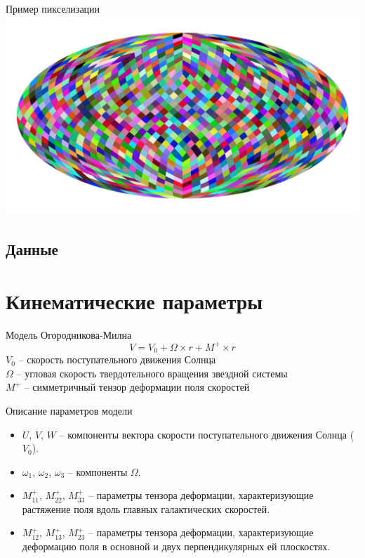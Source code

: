 \documentclass{beamer}
\begin{document}
\begin{frame}{Пример пикселизации}
\includegraphics[width=1\linewidth]{healpexample.jpg}
\end{frame}
\subsection{Данные}

\section{Кинематические параметры}
\begin{frame}{Модель Огородникова-Милна}
\begin{equation}\label{ogorod}
V=V_0+\Omega\times r+M^+\times r
\end{equation}
$V_0$ -- скорость поступательного движения Солнца\\ $\Omega$ -- угловая скорость твердотельного вращения звездной системы \\$M^+$ -- симметричный тензор деформации поля скоростей
\end{frame}

\begin{frame}{Описание параметров модели}
\begin{itemize}
\item $U$, $V$, $W$ -- компоненты вектора скорости поступательного движения Солнца ($V_0$).
\item $\omega_1$, $\omega_2$, $\omega_3$ -- компоненты $\Omega$.
\item $M^+_{11}$, $M^+_{22}$, $M^+_{33}$ -- параметры тензора деформации, характеризующие растяжение поля вдоль главных галактических скоростей.
\item $M^+_{12}$, $M^+_{13}$, $M^+_{23}$ -- параметры тензора деформации, характеризующие деформацию поля в основной и двух перпендикулярных ей плоскостях.\\
\end{itemize}
\end{frame}
\end{document}
